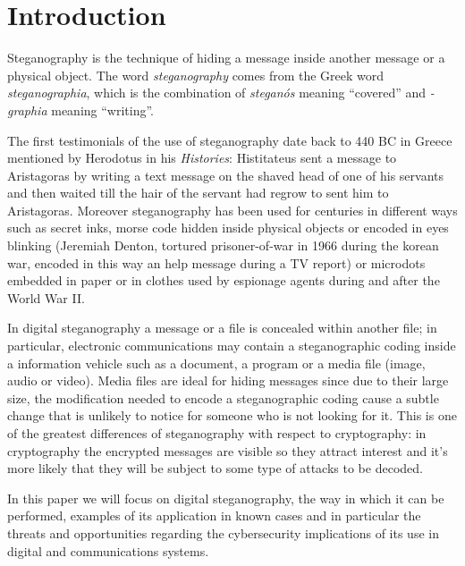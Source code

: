 \documentclass[../../main.tex]{subfiles}
\begin{document}
\section{Introduction}

Steganography is the technique of hiding a message inside another message or a physical object.
The word \textit{steganography} comes from the Greek word \textit{steganographia}, which is the combination of 
\textit{steganós} meaning ``covered'' and \textit{-graphia} meaning ``writing''.

The first testimonials of the use of steganography date back to 440 BC in Greece mentioned by Herodotus in his
\emph{Histories}: Histitateus sent a message to Aristagoras by writing a text message on the shaved head of one of his
servants and then waited till the hair of the servant had regrow to sent him to Aristagoras.
Moreover steganography has been used for centuries in different ways such as secret inks, morse code hidden inside
physical objects or encoded in eyes blinking (Jeremiah Denton, tortured prisoner-of-war in 1966 during the korean
war, encoded in this way an help message during a TV report) or microdots embedded in paper or in clothes used by
espionage agents during and after the World War II.

In digital steganography a message or a file is concealed within another file; in particular, electronic communications
may contain a steganographic coding inside a information vehicle such as a document, a program or a media file (image,
audio or video).
Media files are ideal for hiding messages since due to their large size, the modification needed to encode a
steganographic coding cause a subtle change that is unlikely to notice for someone who is not looking for it.
This is one of the greatest differences of steganography with respect to cryptography: in cryptography the encrypted
messages are visible so they attract interest and it's more likely that they will be subject to some type of attacks to
be decoded.

In this paper we will focus on digital steganography, the way in which it can be performed, examples of its application
in known cases and in particular the threats and opportunities regarding the cybersecurity implications of its use in
digital and communications systems.

\pagebreak
\end{document}
